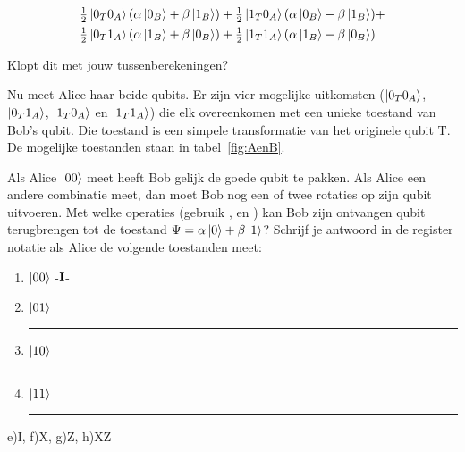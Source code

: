 \documentclass[../../main.tex]{subfiles}
\begin{document}
\[\begin{aligned}
\tfrac{1}{2}\ket{0_T0_A}(\alpha\ket{0_B}+\beta\ket{1_B}) +\tfrac{1}{2}\ket{1_T0_A}(\alpha\ket{0_B} &- \beta\ket{1_B}) +\\
\tfrac{1}{2}\ket{0_T1_A}(\alpha\ket{1_B} + \beta\ket{0_B}) +\tfrac{1}{2}\ket{1_T1_A}(\alpha\ket{1_B} &- \beta\ket{0_B})\\
\end{aligned}\]

Klopt dit met jouw tussenberekeningen?

Nu meet Alice haar beide qubits. Er zijn vier mogelijke uitkomsten ($\ket{0_T0_A}$, $\ket{0_T1_A}$, $\ket{1_T0_A}$ en $\ket{1_T1_A}$) die elk overeenkomen met een unieke toestand van Bob's qubit. Die toestand is een simpele transformatie van het originele qubit T.  De mogelijke toestanden staan in tabel~\ref{fig:AenB}.


\medskip
Als Alice $\ket{00}$ meet heeft Bob gelijk de goede qubit te pakken. Als Alice een andere combinatie meet, dan moet Bob nog een of twee rotaties op zijn qubit uitvoeren.
Met welke operaties (gebruik ,  en ) kan Bob zijn ontvangen qubit terugbrengen tot de toestand $\Psi=\alpha\ket{0}+\beta\ket{1}$? Schrijf je antwoord in de register notatie als Alice de volgende toestanden meet:
\begin{enumerate}[resume]
\item $\ket{00}$  -$\port{I}$-
\item $\ket{01}$  \rule{3cm}{0.15mm} 
\item $\ket{10}$  \rule{3cm}{0.15mm}
\item $\ket{11}$  \rule{3cm}{0.15mm}
\end{enumerate}
\begin{antwoord}[-5cm]
e)I, f)X, g)Z, h)XZ
\end{antwoord}
\end{document}
